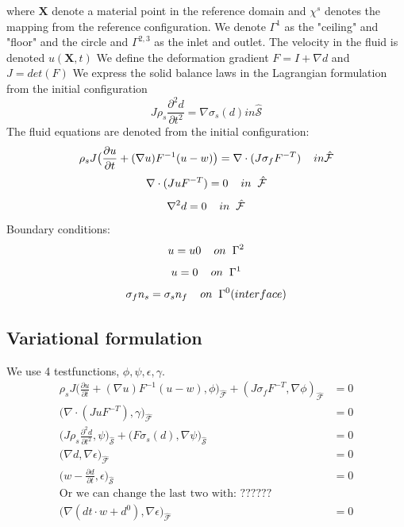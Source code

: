 where $\textbf{X}$ denote a material point in the reference domain and $\chi^s$ denotes the mapping from the reference configuration.
We denote $\Gamma^1$ as the "ceiling" and "floor" and the circle and $\Gamma^{2,3}$ as the inlet and outlet.
The velocity in the fluid is denoted $u(\textbf{X},t)$
We define the deformation gradient $F = I + \nabla d$ and $J = det(F)$
We express the solid balance laws in the Lagrangian formulation from the initial configuration
$$J\rho_s \frac{\partial^2 d}{\partial t^2} = \nabla \sigma_s(d) in \mathcal{\hat{S}} $$
The fluid equations are denoted from the initial configuration:
$$ \rho_s J \big( \frac{\partial u}{\partial t} + (\nabla u)F^{-1}(u-w)\big) = \nabla \cdot (J\sigma_f F^{-T} )\hspace{4mm} in \mathcal{\hat{F}}$$
$$ \nabla \cdot (J u F^{-T}) = 0 \hspace{4mm} in \hspace{2mm} \mathcal{\hat{F}}$$
$$ \nabla^2 d = 0\hspace{4mm}in \hspace{2mm} \mathcal{\hat{F}}$$
Boundary conditions:
$$ u = u0 \hspace{4mm}on \hspace{2mm} \Gamma^2$$
$$ u = 0  \hspace{4mm}on \hspace{2mm} \Gamma^1  $$
$$  \sigma_f n_s = \sigma_s n_f \hspace{4mm} on  \hspace{2mm}\Gamma^0 (interface)   $$
\subsection*{Variational formulation}
We use 4 testfunctions, $\phi, \psi, \epsilon, \gamma$.
\begin{align*}
\rho_s J \big( \frac{\partial u}{\partial t} + (\nabla u)F^{-1}(u-w) , \phi\big)_{\mathcal{\hat{F}}} + (J\sigma_f F^{-T},\nabla \phi )_{\mathcal{\hat{F}}} &= 0  \\
 \big( \nabla \cdot (J u F^{-T}),\gamma \big)_{\mathcal{\hat{F}}} &= 0 \\
\big(J\rho_s \frac{\partial^2 d}{\partial t^2},\psi \big)_{\mathcal{\hat{S}}} + \big(F \sigma_s(d), \nabla \psi \big)_{\mathcal{\hat{S}}} &=0 \\
 \big( \nabla d , \nabla \epsilon \big)_{\mathcal{\hat{F}}} &= 0 \\
 \big( w- \frac{\partial d}{\partial t} ,\epsilon \big)_{\mathcal{\hat{S}}} &= 0 \\
 \text{Or we can change the last two with:  ??????} & \\ 
 \big( \nabla (dt\cdot w + d^0) , \nabla \epsilon \big)_{\mathcal{\hat{F}}} &= 0 
\end{align*}



